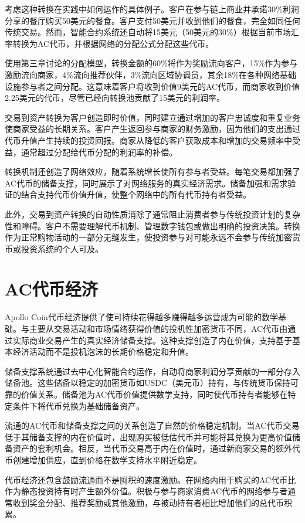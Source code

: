 \documentclass[
  Letterpaper,
]{scrbook}
\begin{document}
考虑这种转换在实践中如何运作的具体例子。客户在参与链上商业并承诺30\%利润分享的餐厅购买50美元的餐食。客户支付50美元并收到他们的餐食，完全如同任何传统交易。然而，智能合约系统还自动将15美元（50美元的30\%）根据当前市场汇率转换为AC代币，并根据网络的分配公式分配这些代币。

使用第三章讨论的分配模型，转换金额的60\%将作为奖励流向客户，15\%作为参与激励流向商家，4\%流向推荐伙伴，3\%流向区域协调员，其余18\%在各种网络基础设施参与者之间分配。这意味着客户将收到价值9美元的AC代币，而商家收到价值2.25美元的代币，尽管已经向转换池贡献了15美元的利润率。

交易到资产转换为客户创造即时价值，同时建立通过增加的客户忠诚度和重复业务使商家受益的长期关系。客户产生返回参与商家的财务激励，因为他们的支出通过代币升值产生持续的投资回报。商家从降低的客户获取成本和增加的交易频率中受益，通常超过分配给代币分配的利润率的补偿。

转换机制还创造了网络效应，随着系统增长使所有参与者受益。每笔交易都加强了AC代币的储备支撑，同时展示了对网络服务的真实经济需求。储备加强和需求验证的结合支持代币价值升值，使整个网络中的所有代币持有者受益。

此外，交易到资产转换的自动性质消除了通常阻止消费者参与传统投资计划的复杂性和障碍。客户不需要理解代币机制、管理数字钱包或做出明确的投资决策。转换作为正常购物活动的一部分无缝发生，使投资参与对可能永远不会参与传统加密货币或投资系统的个人可及。

\section{AC代币经济}\label{acux4ee3ux5e01ux7ecfux6d4e}

Apollo
Coin代币经济提供了使可持续花得越多赚得越多运营成为可能的数学基础。与主要从交易活动和市场情绪获得价值的投机性加密货币不同，AC代币由通过实际商业交易产生的真实经济储备支撑。这种支撑创造了内在价值，支持基于基本经济活动而不是投机泡沫的长期价格稳定和升值。

储备支撑系统通过去中心化智能合约运作，自动将商家利润分享贡献的一部分存入储备池。这些储备以稳定的加密货币如USDC（美元币）持有，与传统货币保持可靠的价值关系。储备池为AC代币价值提供数学支持，同时使代币持有者能够在特定条件下将代币兑换为基础储备资产。

流通的AC代币和储备支撑之间的关系创造了自然的价格稳定机制。当AC代币交易低于其储备支撑的内在价值时，出现购买被低估代币并可能将其兑换为更高价值储备资产的套利机会。相反，当代币交易高于内在价值时，通过新商家交易的额外代币创建增加供应，直到价格在数学支持水平附近稳定。

代币经济还包含鼓励流通而不是囤积的速度激励。在网络内用于购买的AC代币比作为静态投资持有时产生额外价值。积极与参与商家消费AC代币的网络参与者通常收到奖金分配、推荐奖励或其他激励，与被动持有者相比增加他们的总代币积累。
\end{document}
